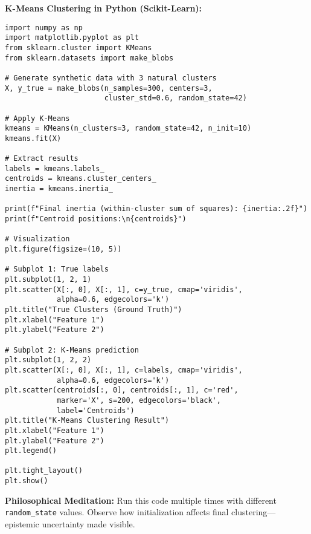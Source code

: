 \begin{codebox}
\textbf{K-Means Clustering in Python (Scikit-Learn):}

\begin{lstlisting}
import numpy as np
import matplotlib.pyplot as plt
from sklearn.cluster import KMeans
from sklearn.datasets import make_blobs

# Generate synthetic data with 3 natural clusters
X, y_true = make_blobs(n_samples=300, centers=3, 
                       cluster_std=0.6, random_state=42)

# Apply K-Means
kmeans = KMeans(n_clusters=3, random_state=42, n_init=10)
kmeans.fit(X)

# Extract results
labels = kmeans.labels_
centroids = kmeans.cluster_centers_
inertia = kmeans.inertia_

print(f"Final inertia (within-cluster sum of squares): {inertia:.2f}")
print(f"Centroid positions:\n{centroids}")

# Visualization
plt.figure(figsize=(10, 5))

# Subplot 1: True labels
plt.subplot(1, 2, 1)
plt.scatter(X[:, 0], X[:, 1], c=y_true, cmap='viridis', 
            alpha=0.6, edgecolors='k')
plt.title("True Clusters (Ground Truth)")
plt.xlabel("Feature 1")
plt.ylabel("Feature 2")

# Subplot 2: K-Means prediction
plt.subplot(1, 2, 2)
plt.scatter(X[:, 0], X[:, 1], c=labels, cmap='viridis', 
            alpha=0.6, edgecolors='k')
plt.scatter(centroids[:, 0], centroids[:, 1], c='red', 
            marker='X', s=200, edgecolors='black', 
            label='Centroids')
plt.title("K-Means Clustering Result")
plt.xlabel("Feature 1")
plt.ylabel("Feature 2")
plt.legend()

plt.tight_layout()
plt.show()
\end{lstlisting}

\textbf{Philosophical Meditation:} Run this code multiple times with different \texttt{random\_state} values. Observe how initialization affects final clustering---epistemic uncertainty made visible.
\end{codebox}

